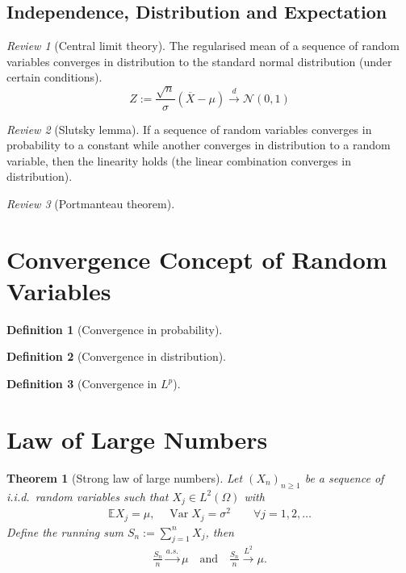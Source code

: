 \documentclass[a4paper,11pt]{book}
\newtheorem{theorem}{Theorem}[section]
\theoremstyle{definition}
\newtheorem{definition}{Definition}[section]
\theoremstyle{remark}
\newtheorem{review}{Review}
\DeclareMathOperator{\var}{Var}
\begin{document}
\subsection{Independence, Distribution and Expectation}
\begin{review}[Central limit theory]
The regularised mean of a sequence of random variables converges in distribution to the standard normal distribution (under certain conditions).
\begin{equation*}
    Z := \frac{\sqrt{n}}{\sigma}(\overline{X} - \mu) \overset{d}{\longrightarrow} \mathcal{N}(0, 1)
\end{equation*}
\end{review}

\begin{review}[Slutsky lemma]
If a sequence of random variables converges in probability to a constant while another converges in distribution to a random variable, then the linearity holds (the linear combination converges in distribution).
\end{review}

\begin{review}[Portmanteau theorem]
\end{review}

\section{Convergence Concept of Random Variables}
\begin{definition}[Convergence in probability]
\end{definition}

\begin{definition}[Convergence in distribution]
\end{definition}

\begin{definition}[Convergence in $L^p$]
\end{definition}



\section{Law of Large Numbers}
\begin{theorem}[Strong law of large numbers]
	Let $(X_n)_{n \ge 1}$ be a sequence of i.i.d.\ random variables such that $X_j \in L^2(\Omega)$ with
	\begin{align*}
		\mathbb{E}X_j = \mu, \quad \var X_j = \sigma^2 \qquad \forall j = 1, 2, \dots
	\end{align*}
	Define the running sum $S_n := \sum_{j = 1}^n X_j$, then
	\begin{align*}
		\frac{S_n}{n} \overset{a.s.}{\longrightarrow} \mu \quad \text{and} \quad \frac{S_n}{n} \overset{L^2}{\longrightarrow} \mu.
	\end{align*}
\end{theorem}
\end{document}

